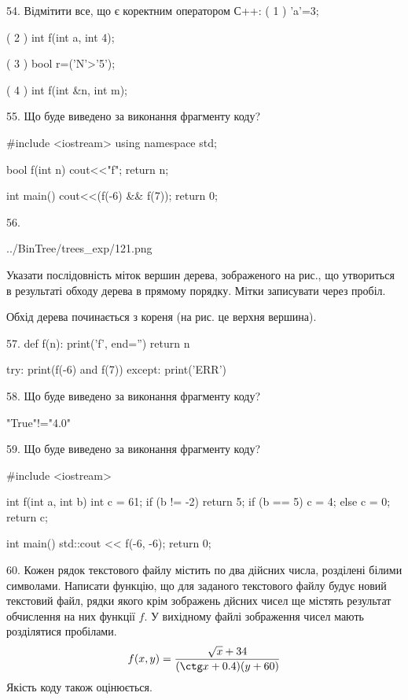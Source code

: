 \documentclass[11pt]{article}
\begin{document}

54. %
Відмітити все, що є коректним оператором С++:
( 1 ) 'a'=3;

( 2 ) int f(int a, int 4);

( 3 ) bool r=('N'>'5');

( 4 ) int f(int &n, int m);


55. Що буде виведено за виконання фрагменту коду?

#include <iostream>
using namespace std;

bool f(int n){
    cout<<"f";
    return n;
}

int main(){
    cout<<(f(-6) && f(7));
    return 0;
}


56. 

\begin{center}
	{../BinTree/trees_exp/121.png}
\end{center}
Указати послідовність міток вершин дерева, зображеного на рис., що утвориться в результаті обходу дерева в прямому порядку. Мітки записувати через пробіл.\par Обхід дерева починається з кореня (на рис. це верхня вершина).


57. 
def f(n):
    print('f', end='')
    return n

try:
    print(f(-6) and f(7))
except:
    print('ERR')


58. Що буде виведено за виконання фрагменту коду?

"True"!="4.0"


59. Що буде виведено за виконання фрагменту коду?

#include <iostream>

int f(int a, int b){
    int c = 61;
    if (b != -2)
        return 5;
    if (b == 5)
         c = 4;
    else 
        c = 0;
    return c;
}

int main(){
    std::cout << f(-6, -6);
    return 0;
}


60. 
Кожен рядок текстового файлу містить по два дійсних числа, розділені білими символами.
Написати функцію, що для заданого текстового файлу будує новий текстовий файл, рядки якого крім зображень дйсних чисел ще містять результат обчислення на них функції $f$. У вихідному файлі зображення чисел мають розділятися пробілами. 
$$f(x, y) =\frac{\sqrt x + 34}{(\ctg x + 0.4) (y + 60)}$$ 
Якість коду також оцінюється.
\end{document}
